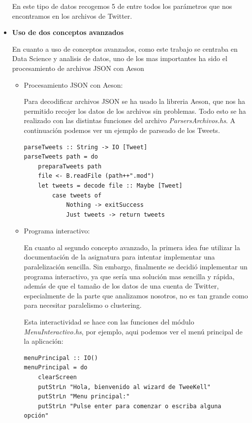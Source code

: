 \documentclass[11pt]{article}
\begin{document}
\begin{itemize}
    En este tipo de datos recogemos 5 de entre todos los parámetros que nos encontramos en los archivos de Twitter.
    
    
    \item \textbf{Uso de dos conceptos avanzados}
    
    En cuanto a uso de conceptos avanzados, como este trabajo se centraba en Data Science y analisis de datos, uno de los mas importantes ha sido el procesamiento de archivos JSON con Aeson
    \begin{itemize}
        \item Procesamiento JSON con Aeson:
        
        Para decodificar archivos JSON se ha usado la libreria Aeson\cite{Aeson}, que nos ha permitido recojer los datos de los archivos sin problemas.
        Todo esto se ha realizado con las distintas funciones del archivo \textit{ParsersArchivos.hs}. A continuación podemos ver un ejemplo de parseado de los Tweets.
        
\begin{verbatim}
parseTweets :: String -> IO [Tweet]
parseTweets path = do
    preparaTweets path
    file <- B.readFile (path++".mod")
    let tweets = decode file :: Maybe [Tweet]
        case tweets of
            Nothing -> exitSuccess
            Just tweets -> return tweets
        \end{verbatim}
        \medskip
        \item Programa interactivo:
        
        En cuanto al segundo concepto avanzado, la primera idea fue utilizar la documentación de la asignatura para intentar implementar una paralelización sencilla. Sin embargo, finalmente se decidió implementar un programa interactivo, ya que sería una solución mas sencilla y rápida, además de que el tamaño de los datos de una cuenta de Twitter, especialmente de la parte que analizamos nosotros, no es tan grande como para necesitar paralelismo o clustering.
        
        Esta interactividad se hace con las funciones del módulo \textit{MenuInteractivo.hs}, por ejemplo, aqui podemos ver el menú principal de la aplicación:
        
        \begin{verbatim}
menuPrincipal :: IO()
menuPrincipal = do
    clearScreen
    putStrLn "Hola, bienvenido al wizard de TweeKell"
    putStrLn "Menu principal:"
    putStrLn "Pulse enter para comenzar o escriba alguna opción"


\end{verbatim}
\end{itemize}
\end{itemize}
\end{document}
